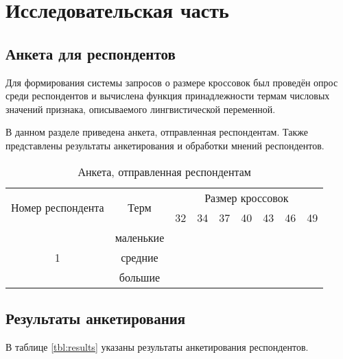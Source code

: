 \chapter{Исследовательская часть}

\section{Анкета для респондентов}

Для формирования системы запросов о размере кроссовок был проведён опрос среди респондентов и вычислена функция принадлежности термам числовых значений признака, описываемого лингвистической переменной.

В данном разделе приведена анкета, отправленная респондентам. 
Также представлены результаты анкетирования и обработки мнений респондентов.

\begin{table}[h]
	\centering
	\caption{Анкета, отправленная респондентам}
	\begin{tabular}{ |c|c|c|c|c|c|c|c|c| }
		\hline
		\multirow{2}{*}{Номер респондента} & \multirow{2}{*}{Терм} & \multicolumn{7}{c|}{Размер кроссовок} \\
		\cline{3-9}
		&& 32 & 34 & 37 & 40 & 43 & 46 & 49 \\
		\hline
		
		\multirow{3}{*}{1} & маленькие &&&&&&&  \\
		\cline{2-9}
		& средние &&&&&&&  \\
		\cline{2-9}
		& большие &&&&&&&  \\		
		\hline
	\end{tabular}
	\label{tbl:form}
\end{table}

\section{Результаты анкетирования}
В таблице \ref{tbl:results} указаны результаты анкетирования респондентов.

